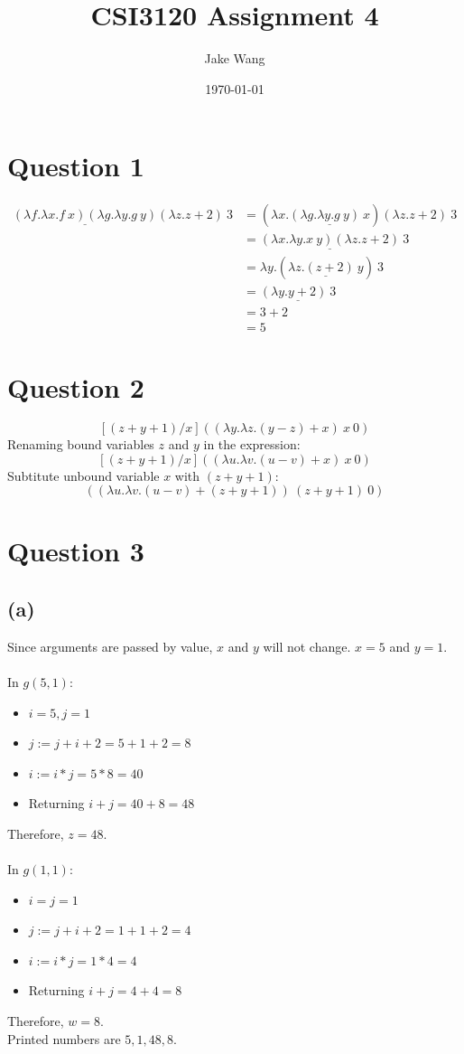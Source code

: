 \documentclass[12pt, a4paper]{article}
\title{CSI3120 Assignment 4}
\author{Jake Wang}
\date{\today}
\begin{document}
	\maketitle
	
	\section*{Question 1}
	\begin{align*}
		\underline{(\lambda f.\lambda x.f\ x)(\lambda g.\lambda y.g\ y)}(\lambda z.z + 2)\ 3
		&= (\lambda x.\underline{(\lambda g.\lambda y.g\ y)\ x}) (\lambda z.z + 2)\ 3 \\
		&= \underline{(\lambda x.\lambda y.x\ y)(\lambda z.z + 2)}\ 3 \\
		&= \lambda y.(\underline{\lambda z.(z + 2)\ y})\ 3 \\
		&= \underline{(\lambda y.y + 2)\ 3} \\
		&= 3 + 2 \\
		&= 5
	\end{align*}
	
	\section*{Question 2}
	$$
		[(z + y + 1) / x]((\lambda y.\lambda z.(y - z) + x)\ x\ 0)
	$$
	Renaming bound variables $z$ and $y$ in the expression:
	$$
		[(z + y + 1) / x]((\lambda u.\lambda v.(u - v) + x)\ x\ 0)
	$$
	Subtitute unbound variable $x$ with $(z + y + 1)$:
	$$
		((\lambda u.\lambda v.(u - v) + (z + y + 1))\ (z + y + 1)\ 0)
	$$
	
	\section*{Question 3}
	\subsection*{(a)}
	Since arguments are passed by value, $x$ and $y$ will not change.
	$x = 5$ and $y = 1$.
	\\\\
	In $g(5, 1)$:
	\begin{itemize}
		\item $i = 5, j = 1$
		\item $j := j + i + 2 = 5 + 1 + 2 = 8$
		\item $i := i * j = 5 * 8 = 40$
		\item Returning $i + j = 40 + 8 = 48$
	\end{itemize}
	Therefore, $z = 48$.\\
	\\
	In $g(1, 1)$:
	\begin{itemize}
		\item $i = j = 1$
		\item $j := j + i + 2 = 1 + 1 + 2 = 4$
		\item $i := i * j = 1 * 4 = 4$
		\item Returning $i + j = 4 + 4 = 8$
	\end{itemize}
	Therefore, $w = 8$.
	\\
	Printed numbers are $5, 1, 48, 8$.
\end{document}
